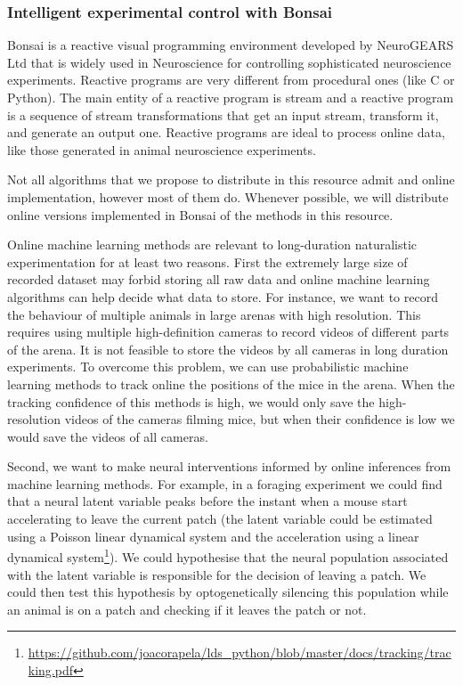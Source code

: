 \subsubsection*{Intelligent experimental control with Bonsai}

Bonsai is a reactive visual programming environment developed by NeuroGEARS Ltd
that is widely used in Neuroscience for controlling sophisticated neuroscience
experiments. Reactive programs are very different from procedural ones (like C
or Python). The main entity of a reactive program is stream and a reactive
program is a sequence of stream transformations that get an input stream,
transform it, and generate an output one. Reactive programs are ideal to
process online data, like those generated in animal neuroscience experiments.

Not all algorithms that we propose to distribute in this resource admit and
online implementation, however most of them do. Whenever possible, we will
distribute online versions implemented in Bonsai of the methods in this
resource.

Online machine learning methods are relevant to long-duration naturalistic
experimentation for at least two reasons. First the extremely large size of
recorded dataset may forbid storing all raw data and online machine learning
algorithms can help decide what data to store. For instance, we want to record
the behaviour of multiple animals in large arenas with high resolution. This
requires using multiple high-definition cameras to record videos of different
parts of the arena. It is not feasible to store the videos by all cameras in
long duration experiments. To overcome this problem, we can use probabilistic
machine learning methods to track online the positions of the mice in the
arena. When the tracking confidence of this methods is high, we would only save
the high-resolution videos of the cameras filming mice, but when their
confidence is low we would save the videos of all cameras.

Second, we want to make neural interventions informed by online inferences from
machine learning methods. For example, in a foraging experiment we could find
that a neural latent variable peaks before the instant when a mouse start
accelerating to leave the current patch (the latent variable could be estimated
using a Poisson linear dynamical system and the acceleration using a linear
dynamical
system\footnote{\url{https://github.com/joacorapela/lds_python/blob/master/docs/tracking/tracking.pdf}}).
We could hypothesise that the neural population associated with the latent
variable is responsible for the decision of leaving a patch. We could then test
this hypothesis by optogenetically silencing this population while an animal is
on a patch and checking if it leaves the patch or not.

